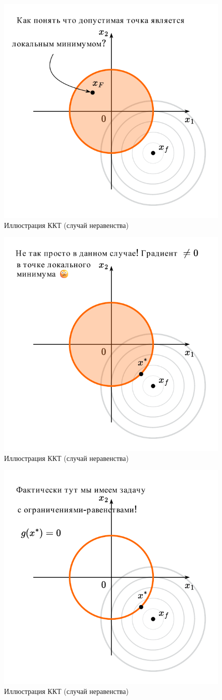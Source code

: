 \documentclass[
  russian,
  letterpaper,
  DIV=11,
  numbers=noendperiod]{scrartcl}
\begin{document}
\begin{figure}[H]

{\centering \includegraphics[width=0.5\linewidth,height=\textheight,keepaspectratio]{graphon-ineq_constr_7_ru.pdf}

}

\caption{Иллюстрация ККТ (случай неравенства)}

\end{figure}%

\begin{figure}[H]

{\centering \includegraphics[width=0.5\linewidth,height=\textheight,keepaspectratio]{graphon-ineq_constr_8_ru.pdf}

}

\caption{Иллюстрация ККТ (случай неравенства)}

\end{figure}%

\begin{figure}[H]

{\centering \includegraphics[width=0.5\linewidth,height=\textheight,keepaspectratio]{graphon-ineq_constr_9_ru.pdf}

}

\caption{Иллюстрация ККТ (случай неравенства)}

\end{figure}%
\end{document}
